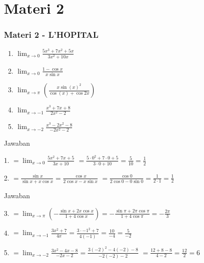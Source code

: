 \documentclass{beamer}
\begin{document}
\section{Materi 2}

\begin{frame}
  \frametitle{Materi 2 - L'HOPITAL}
  \begin{enumerate}
    \item $\lim_{{x \to 0}} \frac{{5x^3 +7x^2 +5x}}{{3x^2 + 10x}}$
    \item $\lim_{{x \to 0}} \frac{{1 - \cos x}}{x \sin x}$
    \item $\lim_{{x \to \pi}} \left(\frac{{x \sin (x)^2}}{{\cos (x) + \cos 2x}}\right)$
    \item $\lim_{{x \to -1}} \frac{{x^3+7x+8}}{{2x^2-2}}$
    \item $\lim_{{x \to -2}} \frac{{x^3-2x^2-8}}{{-2x^2-2}}$
  \end{enumerate}
  \end{frame}
  \begin{frame}{Jawaban}
      \begin{enumerate}
1. $\displaystyle = \lim_{x \to 0} \frac{5x^2+7x+5}{3x+10}$
    $\displaystyle =\frac{5 \cdot 0^2 +7\cdot0+5}{3\cdot0+10} = \frac{5}{10} =\frac{1}{2}$
      \end{enumerate}
      \begin{enumerate}
2. $\displaystyle = \frac{\sin x}{\sin x + x \cos x} = \frac{\cos x}{2 \cos x - x \sin x}$
    $\displaystyle = \frac{\cos0}{2\cos0-0\sin0}=\frac{1}{2\cdot1}=\frac{1}{2}$
      \end{enumerate}
\end{frame}

\begin{frame}{Jawaban}
    \begin{enumerate}
3. $\displaystyle = \lim_{x \to \pi}\left(-\frac{\sin x +2x \cos x}{1+4\cos x}\right) =-\frac{\sin \pi + 2\pi \cos\pi}{1+4\cos\pi}=-\frac{2\pi}{3}$
    \end{enumerate}
    \begin{enumerate}
4. $\displaystyle = \lim_{x \to -1}\frac{3x^2+7}{4x}=\frac{3\cdot-1^2+7}{4\left(-1\right)}=\frac{10}{-4}=\frac{5}{-2}$
    \end{enumerate}
    \begin{enumerate}
5. $\displaystyle =\lim_{x\to -2}\frac{3x^2-4x-8}{-2x-2}=\frac{3\left(-2\right)^2-4\left(-2\right)-8}{-2\left( -2 \right)-2}$
    $\displaystyle =\frac{12+8-8}{4-2}=\frac{12}{2}=6$
    \end{enumerate}
\end{frame}
\end{document}
